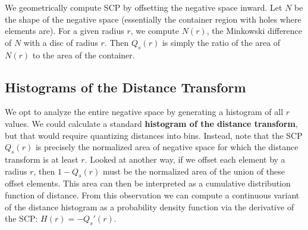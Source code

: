 We geometrically compute SCP by offsetting the negative
space inward.  Let $N$ be the shape of the negative space (essentially
the container region with holes where elements are).  For a given radius
$r$, we compute $N(r)$, the Minkowski difference of $N$ with a disc of
radius $r$.  Then $Q_s(r)$ is simply the ratio of the area of $N(r)$ to
the area of the container.

\subsection{Histograms of the Distance Transform}



\newtext
{
We opt to analyze the entire negative space by generating a histogram of all $r$ values.
}
We could calculate a standard \textbf{histogram of the
distance transform}, but that would require quantizing distances into bins.
Instead, note that the SCP $Q_s(r)$ is precisely the normalized area of 
negative space for which the distance transform is at least $r$. 
Looked at another way, if we offset each element by a
radius $r$, then $1-Q_s(r)$ must be the normalized 
area of the union of these offset elements.
This area can then be interpreted as 
a cumulative distribution function of distance.  From this observation
we can compute a continuous variant of the distance histogram as a 
probability density function via the derivative of the SCP: $H(r)=-Q_s'(r)$.


